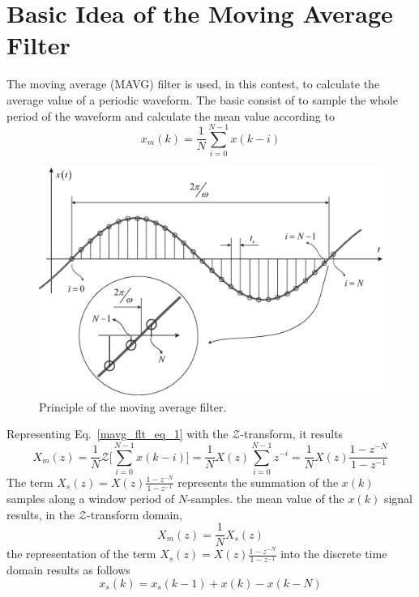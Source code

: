 \documentclass[11pt,a4paper,oneside]{book}
\numberwithin{equation}{section}
\theoremstyle{it}
\theoremstyle{definition}
\begin{document}
\section{Basic Idea of the Moving Average Filter}
The moving average (MAVG) filter is used, in this contest, to calculate the average value of a periodic waveform. The basic consist of to sample the whole period of the waveform and calculate the mean value according to
\begin{equation}\label{mavg_flt_eq_1}
	x_m(k)=\frac{1}{N}\sum_{i=0}^{N-1}x(k-i)
\end{equation}
\begin{figure}[H]
	\centering
	\includegraphics[width = 325pt, angle = 0, 
	keepaspectratio]{figures/mavg_flt_fig_2.eps}
	\captionsetup{width=0.5\textwidth, font=small}
	\caption{Principle of the moving average filter.}
	\label{mavg_flt_fig_1}
\end{figure}
Representing Eq.~\eqref{mavg_flt_eq_1} with the $\mathscr{Z}$-transform, it results
\begin{equation}\label{mavg_flt_eq_2}
	X_m(z)=\frac{1}{N}\mathscr{Z}\Bigg[\sum_{i=0}^{N-1}x(k-i)\Bigg] = \frac{1}{N}X(z)\sum_{i=0}^{N-1}z^{-i}=\frac{1}{N}X(z)\frac{1-z^{-N}}{1-z^{-1}}
\end{equation}
The term $X_s(z)=X(z)\frac{1-z^{-N}}{1-z^{-1}}$ represents the summation of the $x(k)$ samples along a window period of $N$-samples. the mean value of the $x(k)$ signal results, in the $\mathscr{Z}$-transform domain,
\begin{equation}\label{mavg_flt_eq_3}
 	X_m(z)=\frac{1}{N}X_s(z)
\end{equation}
the representation of the term $X_s(z)=X(z)\frac{1-z^{-N}}{1-z^{-1}}$ into the discrete time domain results as follows
\begin{equation}\label{mavg_flt_eq_4}
	x_s(k)=	x_s(k-1)+x(k)-x(k-N)
\end{equation}
\end{document}
